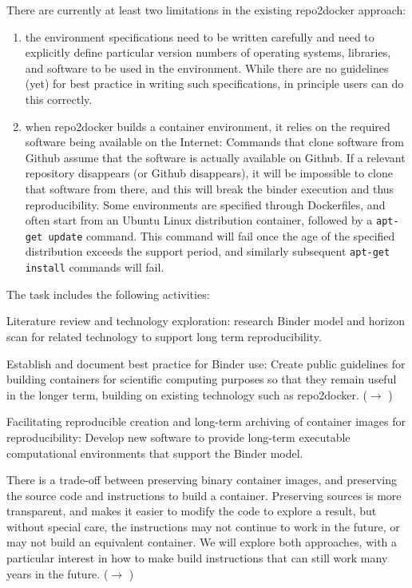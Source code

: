\begin{task}[
  title=Archiving software environments for reproducible computation,
  id=reproducibility,
  lead=XFEL,
  PM=36,
  wphases={1-36},
  partners={XFEL}
]
  There are currently at least two limitations in the existing
  repo2docker approach:
\begin{enumerate}
\item the environment specifications need to be written carefully and
  need to explicitly define particular version numbers of operating
  systems, libraries, and software to be used in the
  environment. While there are no guidelines (yet) for best practice
  in writing such specifications, in principle users can do this
  correctly.
\item when repo2docker builds a container environment, it relies on
  the required software being available on the Internet: Commands that
  clone software from Github assume that the software is actually
  available on Github. If a relevant repository disappears (or Github
  disappears), it will be impossible to clone that software from
  there, and this will break the binder execution and thus
  reproducibility. Some environments are specified through
  Dockerfiles, and often start from an Ubuntu Linux distribution
  container, followed by a \texttt{apt-get update} command. This
  command will fail once the age of the specified distribution exceeds
  the support period, and similarly subsequent \texttt{apt-get
    install} commands will fail.
\end{enumerate}

The task includes the following activities:
\begin{compactitem}

\item Literature review and technology exploration: research Binder
  model and horizon scan for related technology to support long term
  reproducibility.

\item Establish and document best practice for Binder use: Create
  public guidelines for building containers for scientific computing
  purposes so that they remain useful in the longer term, building on
  existing technology such as repo2docker. ($\rightarrow$
  )

\item Facilitating reproducible creation and long-term archiving of
  container images for reproducibility: Develop new software to
  provide long-term executable computational environments that support
  the Binder model.

  There is a trade-off between preserving binary container images, and
  preserving the source code and instructions to build a container.
  Preserving sources is more transparent, and makes it easier to
  modify the code to explore a result, but without special care, the
  instructions may not continue to work in the future, or may not
  build an equivalent container.  We will explore both approaches,
  with a particular interest in how to make build instructions that
  can still work many years in the future.  ($\rightarrow$
  )


\end{compactitem}
\end{task}
